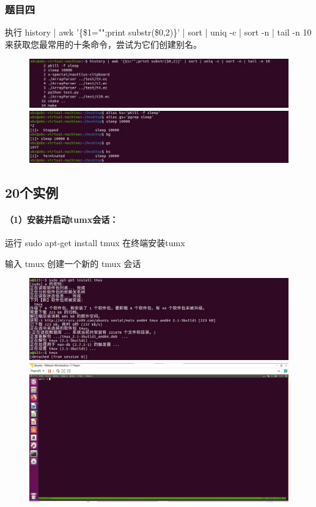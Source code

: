 \documentclass[a4paper, 12pt]{article}
\begin{document}
	\subsubsection{题目四}
	执行 history | awk '\{\$1="";print substr(\$0,2)\}' | sort | uniq -c | sort -n | tail -n 10 来获取您最常用的十条命令，尝试为它们创建别名。
	
	\begin{figure}[H]
		\centering
		\includegraphics[width=1\textwidth]{006.jpg}
		\includegraphics[width=1\textwidth]{008.jpg}
	\end{figure}
	
	\subsection{20个实例}
	
	\paragraph{（1）安装并启动tumx会话：}
	运行 sudo apt-get install tmux 在终端安装tumx
	
	输入 tmux 创建一个新的 tmux 会话
	
	\begin{figure}[H]
		\centering
		\includegraphics[width=1\textwidth]{011.jpg}
		\includegraphics[width=1\textwidth]{010.jpg}
	\end{figure}
	
\end{document}
